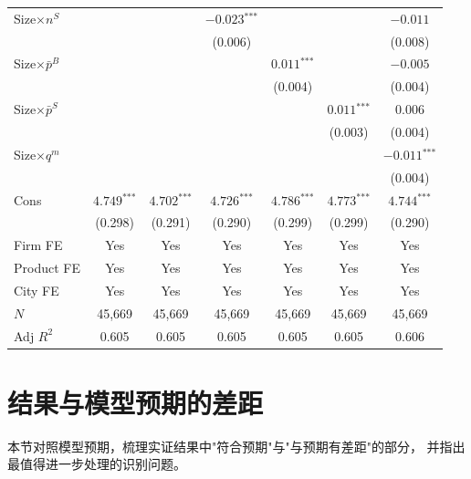\documentclass[12pt]{article}
\newcommand{\sym}[1]{\ensuremath{^{\text{#1}}}}
\newcommand{\se}[1]{{\small(#1)}}
\newcommand{\mis}{}
\begin{document}
\begin{table}[H]
\begin{threeparttable}
\begin{tabular}{lcccccc}
      Size$\times n^S$        & \mis & \mis & $-0.023\sym{***}$ & \mis & \mis & $-0.011$ \\
                              &     &     & \se{0.006}        &     &     & \se{0.008} \\[4pt]
      Size$\times\bar{p}^{B}$ & \mis & \mis & \mis & $0.011\sym{***}$ & \mis & $-0.005$ \\
                              &     &     &     & \se{0.004}       &     & \se{0.004} \\[4pt]
      Size$\times\bar{p}^{S}$ & \mis & \mis & \mis & \mis & $0.011\sym{***}$ & $0.006$ \\
                              &     &     &     &     & \se{0.003}       & \se{0.004} \\[4pt]
      Size$\times q^m$        & \mis & \mis & \mis & \mis & \mis & $-0.011\sym{***}$ \\
                              &     &     &     &     &     & \se{0.004} \\[4pt]
      Cons       & $4.749\sym{***}$ & $4.702\sym{***}$ & $4.726\sym{***}$ & $4.786\sym{***}$ & $4.773\sym{***}$ & $4.744\sym{***}$ \\
                   & \se{0.298}       & \se{0.291}       & \se{0.290}       & \se{0.299}       & \se{0.299}       & \se{0.290}       \\
      \midrule
      Firm FE      & Yes & Yes & Yes & Yes & Yes & Yes \\
      Product FE   & Yes & Yes & Yes & Yes & Yes & Yes \\
      City FE      & Yes & Yes & Yes & Yes & Yes & Yes \\
      $N$          & 45,669 & 45,669 & 45,669 & 45,669 & 45,669 & 45,669 \\
      Adj $R^2$    & 0.605  & 0.605  & 0.605  & 0.605  & 0.605  & 0.606  \\
      \bottomrule
    \end{tabular}
  \end{threeparttable}
\end{table}



\section{结果与模型预期的差距}

本节对照模型预期，梳理实证结果中"符合预期"与"与预期有差距"的部分，
并指出最值得进一步处理的识别问题。
\end{document}
